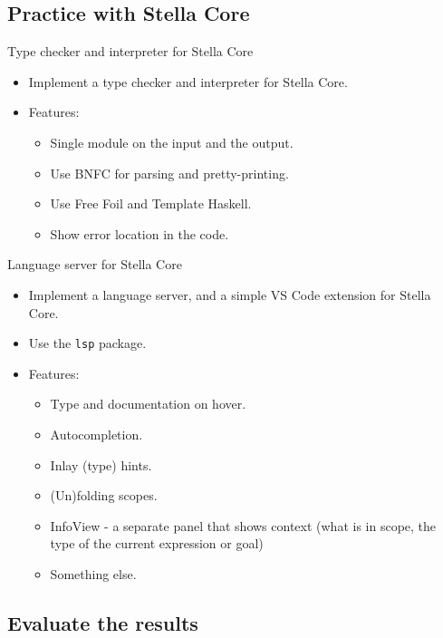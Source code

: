 \documentclass[serif, aspectratio=169]{beamer}
\begin{document}
\subsection{Practice with Stella Core}

\begin{frame}{Type checker and interpreter for Stella Core}
	\begin{itemize}
		\item Implement a type checker and interpreter for Stella Core.
		\item Features:
		      \begin{itemize}
			      \item Single module on the input and the output.
			      \item Use BNFC for parsing and pretty-printing.
			      \item Use Free Foil and Template Haskell.
			      \item Show error location in the code.
		      \end{itemize}
	\end{itemize}

\end{frame}

\begin{frame}{Language server for Stella Core}
	\begin{itemize}
		\item Implement a language server, and a simple VS Code extension for Stella Core.
		\item Use the \texttt{lsp} \cite{hackage_lsp} package.
		\item Features:
		      \begin{itemize}
			      \item Type and documentation on hover.
			      \item Autocompletion.
			      \item Inlay (type) hints.
			      \item (Un)folding scopes.
			      \item InfoView - a separate panel that shows context (what is in scope, the type of the current expression or goal)
			      \item Something else.
		      \end{itemize}
	\end{itemize}

\end{frame}

\subsection{Evaluate the results}
\end{document}
